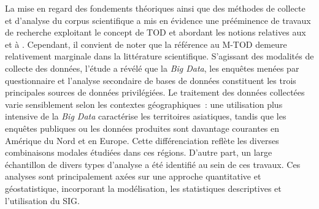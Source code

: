 \begin{refsegment}
La mise en regard des fondements théoriques ainsi que des méthodes de collecte et d'analyse du corpus scientifique a mis en évidence une prééminence de travaux de recherche exploitant le concept de \acrshort{TOD} et abordant les notions relatives aux  et à . Cependant, il convient de noter que la référence au \acrshort{M-TOD} demeure relativement marginale dans la littérature scientifique. S'agissant des modalités de collecte des données, l'étude a révélé que la \textsl{Big Data}, les enquêtes menées par questionnaire et l'analyse secondaire de bases de données constituent les trois principales sources de données privilégiées. Le traitement des données collectées varie sensiblement selon les contextes géographiques~: une utilisation plus intensive de la \textsl{Big Data} caractérise les territoires asiatiques, tandis que les enquêtes publiques ou les données produites sont davantage courantes en Amérique du Nord et en Europe. Cette différenciation reflète les diverses combinaisons modales étudiées dans ces régions. D'autre part, un large échantillon de divers types d'analyse a été identifié au sein de ces travaux. Ces analyses sont principalement axées sur une approche quantitative et géostatistique, incorporant la modélisation, les statistiques descriptives et l'utilisation du \acrshort{SIG}.%


\end{refsegment}
